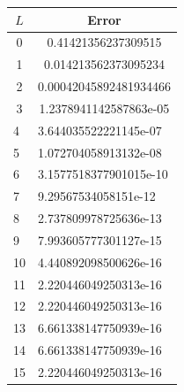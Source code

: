 \documentclass[12pt, a4paper]{article}
\begin{document}
\begin{minipage}{\textwidth}\centering
	\begin{tabular}{|l|l|}
	\hline
	\multicolumn{1}{|c|}{$L$} & \multicolumn{1}{c|}{Error}                  \\ \hline
	\multicolumn{1}{|c|}{0}   & \multicolumn{1}{c|}{0.41421356237309515}    \\ \hline
	\multicolumn{1}{|c|}{1}   & \multicolumn{1}{c|}{0.014213562373095234}   \\ \hline
	\multicolumn{1}{|c|}{2}   & \multicolumn{1}{c|}{0.00042045892481934466} \\ \hline
	\multicolumn{1}{|c|}{3}   & \multicolumn{1}{c|}{1.2378941142587863e-05} \\ \hline
	4                         & 3.644035522221145e-07                       \\ \hline
	5                         & 1.072704058913132e-08                       \\ \hline
	6                         & 3.1577518377901015e-10                      \\ \hline
	7                         & 9.29567534058151e-12                        \\ \hline
	8                         & 2.737809978725636e-13                       \\ \hline
	9                         & 7.993605777301127e-15                       \\ \hline
	10                        & 4.440892098500626e-16                       \\ \hline
	11                        & 2.220446049250313e-16                       \\ \hline
	12                        & 2.220446049250313e-16                       \\ \hline
	13                        & 6.661338147750939e-16                       \\ \hline
	14                        & 6.661338147750939e-16                       \\ \hline
	15                        & 2.220446049250313e-16                       \\ \hline
	\end{tabular}
\end{minipage}
\vspace{0.3cm}
\end{document}
